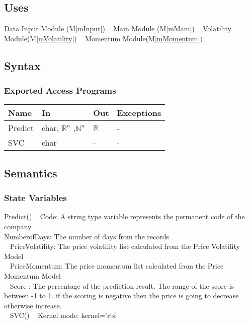 \documentclass[12pt, titlepage]{article}
\newcommand{\mref}[1]{M\ref{#1}}
\begin{document}
\subsection{Uses}
Data Input Module (\mref{mInput})
~\newline
Main Module (\mref{mMain})
~\newline
Volatility Module(\mref{mVolatility})
~\newline
Momentum Module(\mref{mMomentum})
\subsection{Syntax}

\subsubsection{Exported Access Programs}

\begin{center}
\begin{tabular}{p{2cm} p{4cm} p{2cm} p{2cm}}
\hline
\textbf{Name} & \textbf{In} & \textbf{Out} & \textbf{Exceptions} \\
\hline

Predict & char, $\mathbb{R}^n$ ,$\mathbb{N}^n$ & $\mathbb{R}$ &- \\
SVC &char &- & - \\ 
\hline
\end{tabular}
\end{center}

\subsection{Semantics}
\subsubsection{State Variables}
Predict()
~\newline
Code: A string type variable represents the permanent code of the company\\ 
NumberofDays: The number of days from the records\\ 
~\newline
PriceVolatility: The price volatility list calculated from the Price Volatility Model\\
~\newline
PriceMomentum: The price momentum list calculated from the Price Momentum Model\\
~\newline
Score : The percentage of the prediction result. The range of the score is between -1 to 1. if the scoring is negative then the price is going to decrease otherwise increase. \\
~\newline
SVC()
~\newline
Kernel mode: kernel='rbf
\end{document}
